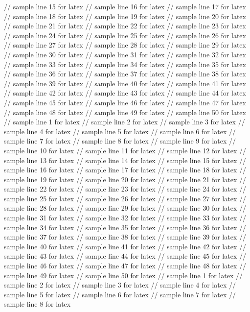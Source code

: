 // sample line 15 for latex
// sample line 16 for latex
// sample line 17 for latex
// sample line 18 for latex
// sample line 19 for latex
// sample line 20 for latex
// sample line 21 for latex
// sample line 22 for latex
// sample line 23 for latex
// sample line 24 for latex
// sample line 25 for latex
// sample line 26 for latex
// sample line 27 for latex
// sample line 28 for latex
// sample line 29 for latex
// sample line 30 for latex
// sample line 31 for latex
// sample line 32 for latex
// sample line 33 for latex
// sample line 34 for latex
// sample line 35 for latex
// sample line 36 for latex
// sample line 37 for latex
// sample line 38 for latex
// sample line 39 for latex
// sample line 40 for latex
// sample line 41 for latex
// sample line 42 for latex
// sample line 43 for latex
// sample line 44 for latex
// sample line 45 for latex
// sample line 46 for latex
// sample line 47 for latex
// sample line 48 for latex
// sample line 49 for latex
// sample line 50 for latex
// sample line 1 for latex
// sample line 2 for latex
// sample line 3 for latex
// sample line 4 for latex
// sample line 5 for latex
// sample line 6 for latex
// sample line 7 for latex
// sample line 8 for latex
// sample line 9 for latex
// sample line 10 for latex
// sample line 11 for latex
// sample line 12 for latex
// sample line 13 for latex
// sample line 14 for latex
// sample line 15 for latex
// sample line 16 for latex
// sample line 17 for latex
// sample line 18 for latex
// sample line 19 for latex
// sample line 20 for latex
// sample line 21 for latex
// sample line 22 for latex
// sample line 23 for latex
// sample line 24 for latex
// sample line 25 for latex
// sample line 26 for latex
// sample line 27 for latex
// sample line 28 for latex
// sample line 29 for latex
// sample line 30 for latex
// sample line 31 for latex
// sample line 32 for latex
// sample line 33 for latex
// sample line 34 for latex
// sample line 35 for latex
// sample line 36 for latex
// sample line 37 for latex
// sample line 38 for latex
// sample line 39 for latex
// sample line 40 for latex
// sample line 41 for latex
// sample line 42 for latex
// sample line 43 for latex
// sample line 44 for latex
// sample line 45 for latex
// sample line 46 for latex
// sample line 47 for latex
// sample line 48 for latex
// sample line 49 for latex
// sample line 50 for latex
// sample line 1 for latex
// sample line 2 for latex
// sample line 3 for latex
// sample line 4 for latex
// sample line 5 for latex
// sample line 6 for latex
// sample line 7 for latex
// sample line 8 for latex

